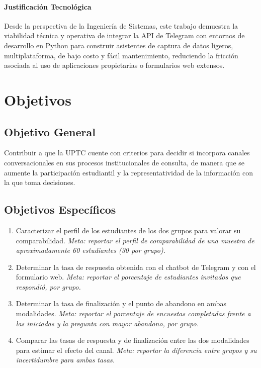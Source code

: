 \documentclass[12pt,letterpaper]{article}
\begin{document}
\paragraph{Justificación Tecnológica}
Desde la perspectiva de la Ingeniería de Sistemas, este trabajo demuestra la viabilidad técnica y operativa de integrar la API de Telegram con entornos de desarrollo en Python para construir asistentes de captura de datos ligeros, multiplataforma, de bajo costo y fácil mantenimiento, reduciendo la fricción asociada al uso de aplicaciones propietarias o formularios web extensos.

\section{Objetivos}
\subsection{Objetivo General}
Contribuir a que la UPTC cuente con criterios para decidir si incorpora canales conversacionales en sus procesos institucionales de consulta, de manera que se aumente la participación estudiantil y la representatividad de la información con la que toma decisiones.

\subsection{Objetivos Específicos}
\begin{enumerate}
  \item Caracterizar el perfil de los estudiantes de los dos grupos para valorar su comparabilidad. \textit{Meta: reportar el perfil de comparabilidad de una muestra de aproximadamente 60 estudiantes (30 por grupo).}
  \item Determinar la tasa de respuesta obtenida con el chatbot de Telegram y con el formulario web. \textit{Meta: reportar el porcentaje de estudiantes invitados que respondió, por grupo.}
  \item Determinar la tasa de finalización y el punto de abandono en ambas modalidades. \textit{Meta: reportar el porcentaje de encuestas completadas frente a las iniciadas y la pregunta con mayor abandono, por grupo.}
  \item Comparar las tasas de respuesta y de finalización entre las dos modalidades para estimar el efecto del canal. \textit{Meta: reportar la diferencia entre grupos y su incertidumbre para ambas tasas.}
\end{enumerate}
\end{document}
